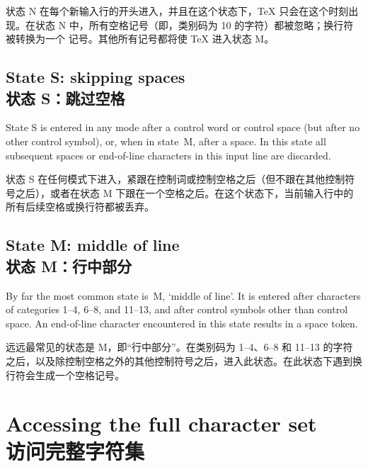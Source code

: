 状态 {\italic N} 在每个新输入行的开头进入，并且在这个状态下，\TeX{} 只会在这个时刻出现。在状态 {\italic N} 中，所有空格记号（即，类别码为 10 的字符）都被忽略；换行符被转换为一个  记号。其他所有记号都将使 \TeX{} 进入状态 {\italic M}。


\subsection{State {\italic S}: skipping spaces\\状态 {\italic S}：跳过空格}

State {\italic S} is entered in any mode after a control word or
control space (but after no other control symbol),
or, when in state~{\italic M}, after a space.
In this state all subsequent spaces or end-of-line characters
in this input line are discarded.

状态 {\italic S} 在任何模式下进入，紧跟在控制词或控制空格之后（但不跟在其他控制符号之后），或者在状态 {\italic M} 下跟在一个空格之后。在这个状态下，当前输入行中的所有后续空格或换行符都被丢弃。

\subsection{State {\italic M}: middle of line\\状态 {\italic M}：行中部分}

By far the most common state is~{\italic M}, `middle of line'.
It is entered after characters of categories
1--4, 6--8, and 11--13, and after control symbols
other than control space.
An end-of-line character encountered in this state
results in a space token.

远远最常见的状态是 {\italic M}，即“行中部分”。在类别码为 1--4、6--8 和 11--13 的字符之后，以及除控制空格之外的其他控制符号之后，进入此状态。在此状态下遇到换行符会生成一个空格记号。

\relax %
\begin{tdisp}%
\leavevmode\relax
{}
\end{tdisp}



\section{Accessing the full character set\\访问完整字符集}
\label{hathat}

